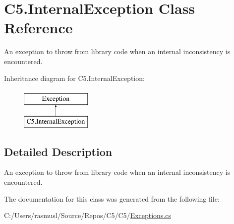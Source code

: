 \hypertarget{class_c5_1_1_internal_exception}{}\section{C5.\+Internal\+Exception Class Reference}
\label{class_c5_1_1_internal_exception}


An exception to throw from library code when an internal inconsistency is encountered.  


Inheritance diagram for C5.\+Internal\+Exception\+:\begin{figure}[H]
\begin{center}
\leavevmode
\includegraphics[height=2.000000cm]{class_c5_1_1_internal_exception}
\end{center}
\end{figure}


\subsection{Detailed Description}
An exception to throw from library code when an internal inconsistency is encountered. 



The documentation for this class was generated from the following file\+:\begin{DoxyCompactItemize}
\item 
C\+:/\+Users/rasmusl/\+Source/\+Repos/\+C5/\+C5/\hyperlink{_exceptions_8cs}{Exceptions.\+cs}\end{DoxyCompactItemize}
